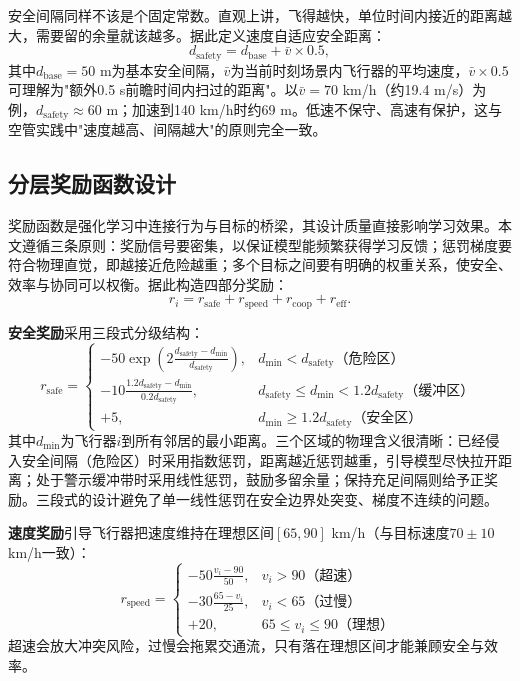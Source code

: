 \documentclass[12pt,a4paper,UTF8]{ctexart}
\begin{document}
安全间隔同样不该是个固定常数。直观上讲，飞得越快，单位时间内接近的距离越大，需要留的余量就该越多。据此定义速度自适应安全距离：
\begin{equation}
    d_{\text{safety}} = d_{\text{base}} + \bar{v} \times 0.5,
    \label{eq:safety_distance}
\end{equation}
其中$d_{\text{base}}=50$ m为基本安全间隔，$\bar{v}$为当前时刻场景内飞行器的平均速度，$\bar{v}\times0.5$可理解为"额外0.5 s前瞻时间内扫过的距离"。以$\bar{v}=70$ km/h（约19.4 m/s）为例，$d_{\text{safety}}\approx60$ m；加速到140 km/h时约69 m。低速不保守、高速有保护，这与空管实践中"速度越高、间隔越大"的原则完全一致。

\subsection{分层奖励函数设计}

奖励函数是强化学习中连接行为与目标的桥梁，其设计质量直接影响学习效果。本文遵循三条原则：奖励信号要密集，以保证模型能频繁获得学习反馈；惩罚梯度要符合物理直觉，即越接近危险越重；多个目标之间要有明确的权重关系，使安全、效率与协同可以权衡。据此构造四部分奖励：
\begin{equation}
    r_i = r_{\text{safe}} + r_{\text{speed}} + r_{\text{coop}} + r_{\text{eff}}.
    \label{eq:reward_total}
\end{equation}

\textbf{安全奖励}采用三段式分级结构：
\begin{equation}
    r_{\text{safe}} = \begin{cases}
        -50 \exp\!\left(2\frac{d_{\text{safety}}-d_{\min}}{d_{\text{safety}}}\right), & d_{\min}<d_{\text{safety}} \text{（危险区）}\\
        -10 \frac{1.2d_{\text{safety}}-d_{\min}}{0.2d_{\text{safety}}}, & d_{\text{safety}}\leq d_{\min}<1.2d_{\text{safety}} \text{（缓冲区）}\\
        +5, & d_{\min}\geq1.2d_{\text{safety}} \text{（安全区）}
    \end{cases}
    \label{eq:reward_safe}
\end{equation}
其中$d_{\min}$为飞行器$i$到所有邻居的最小距离。三个区域的物理含义很清晰：已经侵入安全间隔（危险区）时采用指数惩罚，距离越近惩罚越重，引导模型尽快拉开距离；处于警示缓冲带时采用线性惩罚，鼓励多留余量；保持充足间隔则给予正奖励。三段式的设计避免了单一线性惩罚在安全边界处突变、梯度不连续的问题。

\textbf{速度奖励}引导飞行器把速度维持在理想区间$[65,90]$ km/h（与目标速度$70\pm10$ km/h一致）：
\begin{equation}
    r_{\text{speed}} = \begin{cases}
        -50\frac{v_i-90}{50}, & v_i>90 \text{（超速）}\\
        -30\frac{65-v_i}{25}, & v_i<65 \text{（过慢）}\\
        +20, & 65\leq v_i\leq 90 \text{（理想）}
    \end{cases}
    \label{eq:reward_speed}
\end{equation}
超速会放大冲突风险，过慢会拖累交通流，只有落在理想区间才能兼顾安全与效率。
\end{document}

